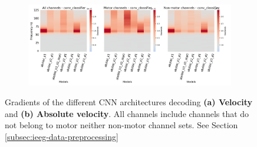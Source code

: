 \begin{figure}[!htpb]
\begin{subfigure}[d]{\textwidth}
   \includegraphics[width=1\linewidth]{img/appendix/A/conv-classifier/hp-m/absVel-model_gradients_all_kinds}
   \caption{}
   \label{fig:absVel-hp-grads-conv-classifier}
\end{subfigure}

\caption[]{Gradients of the different CNN architectures decoding \textbf{(a) Velocity} and \textbf{(b) Absolute velocity}. All channels include channels that do not belong to motor neither non-motor channel sets. See Section \ref{subsec:ieeg-data-preprocessing}}
\label{fig:absVel-hp-grads}
\end{figure}